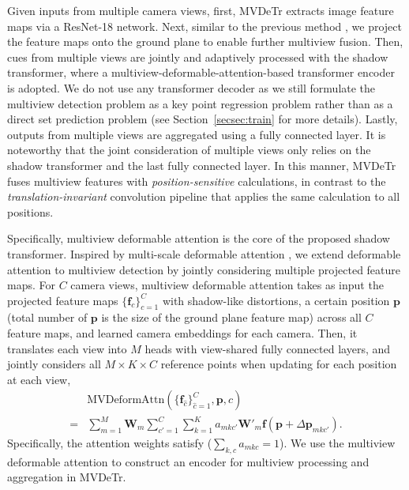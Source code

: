\documentclass[sigconf,authorversion,nonacm]{acmart}
\begin{document}
Given inputs from multiple camera views, first, MVDeTr extracts image feature maps via a ResNet-18 \cite{he2016deep} network. Next, similar to the previous method \cite{hou2020multiview}, we project the feature maps onto the ground plane to enable further multiview fusion. Then, cues from multiple views are jointly and adaptively processed with the shadow transformer, where a multiview-deformable-attention-based transformer encoder is adopted. We do not use any transformer decoder as we still formulate the multiview detection problem as a key point regression problem \cite{law2018cornernet,zhou2019objects} rather than as a direct set prediction problem \cite{carion2020end} (see Section~\ref{secsec:train} for more details). Lastly, outputs from multiple views are aggregated using a fully connected layer. 
It is noteworthy that the joint consideration of multiple views only relies on the shadow transformer and the last fully connected layer. In this manner, MVDeTr fuses multiview features with \textit{position-sensitive} calculations, in contrast to the \textit{translation-invariant} convolution pipeline that applies the same calculation to all positions. 

Specifically, multiview deformable attention is the core of the proposed shadow transformer. Inspired by multi-scale deformable attention \cite{zhu2021deformable}, we extend deformable attention to multiview detection by jointly considering multiple projected feature maps. 
For $C$ camera views, multiview deformable attention takes as input the projected feature maps $\{\bm{f}_c\}_{c=1}^C$ with shadow-like distortions, a certain position $\bm{p}$ (total number of $\bm{p}$ is the size of the ground plane feature map) across all $C$ feature maps, and learned camera embeddings for each camera. Then, it translates each view into $M$ heads with view-shared fully connected layers, and jointly considers all $M \times K \times C$ reference points when updating for each position at each view, 
\begin{equation}
\label{eq:mvattn}
\begin{aligned}
    & \text{MVDeformAttn}\left(\{\bm{f}_{\hat{c}}\}_{\hat{c}=1}^C,\bm{p},c\right)  \\
=  &\sum_{m=1}^{M} \bm{W}_m \sum_{c'=1}^C{\sum_{k=1}^{K}{a_{mkc'}  \bm{W}'_m \bm{f}(\bm{p}+\Delta \bm{p}_{mkc'})}}.
\end{aligned}
\end{equation}
Specifically, the attention weights satisfy ($\sum_{k,c}{a_{mkc}}=1$).
We use the multiview deformable attention to construct an encoder for multiview processing and aggregation in MVDeTr. 
\end{document}
